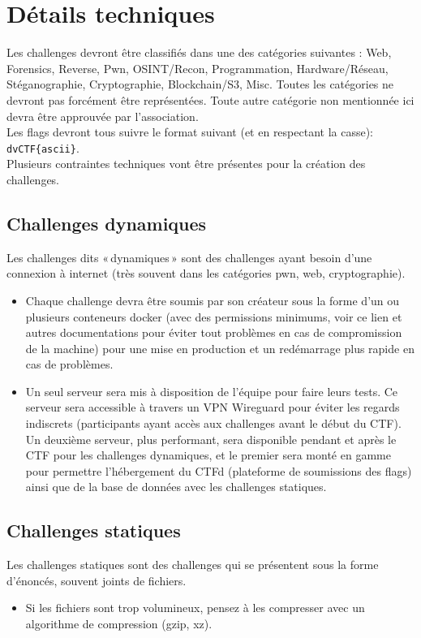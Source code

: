 \documentclass[12pt]{article}
\begin{document}
    \section{Détails techniques}

Les challenges devront être classifiés dans une des catégories suivantes : Web, Forensics, Reverse, Pwn, OSINT/Recon, Programmation, Hardware/Réseau, Stéganographie, Cryptographie, Blockchain/S3, Misc. Toutes les catégories ne devront pas forcément être représentées.  Toute autre catégorie non mentionnée ici devra être approuvée par l’association.\\
Les flags devront tous suivre le format suivant (et en respectant la casse): \verb+dvCTF{ascii}+.\\
Plusieurs contraintes techniques vont être présentes pour la création des challenges.

    \subsection{Challenges dynamiques}

Les challenges dits « dynamiques » sont des challenges ayant besoin d’une connexion à internet (très souvent dans les catégories pwn, web, cryptographie).

    \begin{itemize}
        \item{Chaque challenge devra être soumis par son créateur sous la forme d’un ou plusieurs conteneurs docker (avec des permissions minimums, voir ce lien et autres documentations pour éviter tout problèmes en cas de compromission de la machine) pour une mise en production et un redémarrage plus rapide en cas de problèmes.}
        \item{Un seul serveur sera mis à disposition de l’équipe pour faire leurs tests. Ce serveur sera accessible à travers un VPN Wireguard pour éviter les regards indiscrets (participants ayant accès aux challenges avant le début du CTF). Un deuxième serveur, plus performant, sera disponible pendant et après le CTF pour les challenges dynamiques, et le premier sera monté en gamme pour permettre l’hébergement du CTFd (plateforme de soumissions des flags) ainsi que de la base de données avec les challenges statiques.}
    \end{itemize}

    \subsection{Challenges statiques}

    Les challenges statiques sont des challenges qui se présentent sous la forme d’énoncés, souvent joints de fichiers.

    \begin{itemize}
        \item{Si les fichiers sont trop volumineux, pensez à les compresser avec un algorithme de compression (gzip, xz).}
    \end{itemize}
\end{document}
